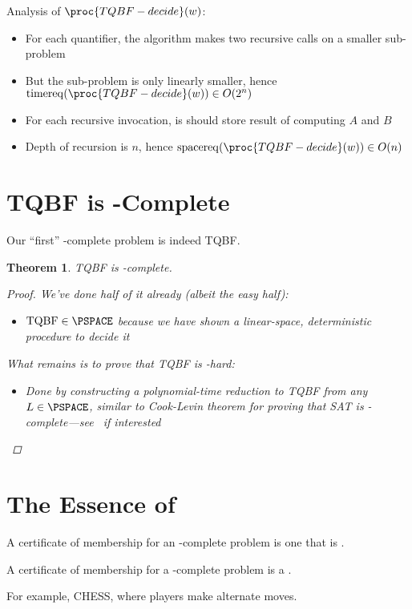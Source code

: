 \documentclass[a4paper]{report}
\newtheorem{theo}{Theorem}
\newcommand{\bookref}[3]{\marginpar{\faBook{}~#1\\Chapter #2\\Section #3}}
\theoremstyle{definition}
\DeclareMathOperator*{\treq}{timereq}
\DeclareMathOperator*{\sreq}{spacereq}
\begin{document}
Analysis of $\proc{TQBF-decide}(w)$:
\begin{itemize}
\item For each quantifier, the algorithm makes two recursive calls on a smaller sub-problem
\item But the sub-problem is only linearly smaller, hence $\treq(\proc{TQBF-decide}(w)) \in O(2^n)$
\item For each recursive invocation, is should store result of computing $A$ and $B$
\item Depth of recursion is $n$, hence $\sreq(\proc{TQBF-decide}(w)) \in O(n)$
\end{itemize}

\section{TQBF is \PSPACE-Complete}
\bookref{ER}{29}{29.3.2}
Our ``first'' \PSPACE-complete problem is indeed TQBF.
\begin{theo}
TQBF is \PSPACE-complete.
\begin{proof}
We've done half of it already (albeit the easy half):
\begin{itemize}
\item $\text{TQBF} \in \PSPACE$ because we have shown a linear-space, deterministic procedure to decide it
\end{itemize}
What remains is to prove that TQBF is \PSPACE-hard:
\begin{itemize}
\item Done by constructing a polynomial-time reduction to TQBF from any $L \in \PSPACE$, similar to Cook-Levin theorem for proving that SAT is \NP-complete---see~\citep{rich2008automata} if interested
\end{itemize}
\end{proof}
\end{theo}

\section{The Essence of \PSPACE}
\bookref{ER}{29}{29.3.3}
A certificate of membership for an \NP-complete problem is one that is .

A certificate of membership for a \PSPACE-complete problem is a .

For example, CHESS, where players make alternate moves.
\end{document}

